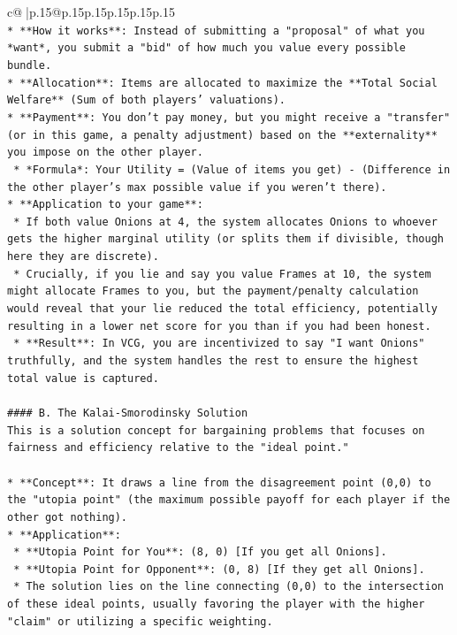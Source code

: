\documentclass{article}
\begin{document}
{\begin{supertabular}{c@{$\;$}|p{.15\linewidth}@{}p{.15\linewidth}p{.15\linewidth}p{.15\linewidth}p{.15\linewidth}p{.15\linewidth}}
{{{\\ 
\texttt{*   **How it works**: Instead of submitting a "proposal" of what you *want*, you submit a "bid" of how much you value every possible bundle.} \\
\texttt{*   **Allocation**: Items are allocated to maximize the **Total Social Welfare** (Sum of both players' valuations).} \\
\texttt{*   **Payment**: You don't pay money, but you might receive a "transfer" (or in this game, a penalty adjustment) based on the **externality** you impose on the other player.} \\
\texttt{    *   *Formula*: Your Utility = (Value of items you get) {-} (Difference in the other player's max possible value if you weren't there).} \\
\texttt{*   **Application to your game**:} \\
\texttt{    *   If both value Onions at 4, the system allocates Onions to whoever gets the higher marginal utility (or splits them if divisible, though here they are discrete).} \\
\texttt{    *   Crucially, if you lie and say you value Frames at 10, the system might allocate Frames to you, but the payment/penalty calculation would reveal that your lie reduced the total efficiency, potentially resulting in a lower net score for you than if you had been honest.} \\
\texttt{    *   **Result**: In VCG, you are incentivized to say "I want Onions" truthfully, and the system handles the rest to ensure the highest total value is captured.} \\
\\ 
\texttt{\#\#\#\# B. The Kalai{-}Smorodinsky Solution} \\
\texttt{This is a solution concept for bargaining problems that focuses on fairness and efficiency relative to the "ideal point."} \\
\\ 
\texttt{*   **Concept**: It draws a line from the disagreement point (0,0) to the "utopia point" (the maximum possible payoff for each player if the other got nothing).} \\
\texttt{*   **Application**:} \\
\texttt{    *   **Utopia Point for You**: (8, 0) {[}If you get all Onions{]}.} \\
\texttt{    *   **Utopia Point for Opponent**: (0, 8) {[}If they get all Onions{]}.} \\
\texttt{    *   The solution lies on the line connecting (0,0) to the intersection of these ideal points, usually favoring the player with the higher "claim" or utilizing a specific weighting.} \\
}}}
\end{supertabular}}
\end{document}
